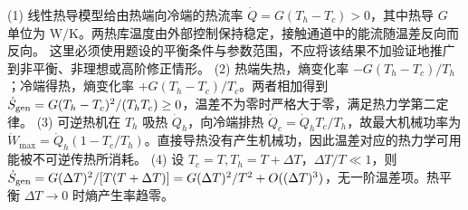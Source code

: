 (1) 线性热导模型给由热端向冷端的热流率 \(\dot Q=G(T_h-T_c)>0\)，其中热导 \(G\) 单位为 \(\mathrm{W/K}\)。两热库温度由外部控制保持稳定，接触通道中的能流随温差反向而反向。 这里必须使用题设的平衡条件与参数范围，不应将该结果不加验证地推广到非平衡、非理想或高阶修正情形。
(2) 热端失热，熵变化率 \(-G(T_h-T_c)/T_h\)；冷端得热，熵变化率 \(+G(T_h-T_c)/T_c\)。两者相加得到 \(\dot S_{\rm gen}=G(T_h-T_c)^2/(T_hT_c)\ge0\)，温差不为零时严格大于零，满足热力学第二定律。
(3) 可逆热机在 \(T_h\) 吸热 \(\dot Q_h\)，向冷端排热 \(\dot Q_c=\dot Q_hT_c/T_h\)，故最大机械功率为 \(\dot W_{\max}=\dot Q_h(1-T_c/T_h)\)。直接导热没有产生机械功，因此温差对应的热力学可用能被不可逆传热所消耗。
(4) 设 \(T_c=T,T_h=T+\Delta T\)，\(\Delta T/T\ll1\)，则 \(\dot S_{\rm gen}=G(\Delta T)^2/[T(T+\Delta T)]=G(\Delta T)^2/T^2+O((\Delta T)^3)\)，无一阶温差项。热平衡 \(\Delta T\to0\) 时熵产生率趋零。
